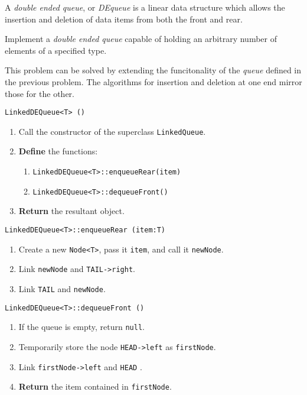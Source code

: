 

\problem A \textit{double ended queue}, or \textit{DEqueue} is a linear data structure which allows the insertion
and deletion of data items from both the front and rear.

Implement a \textit{double ended queue} capable of holding an arbitrary number of elements of a specified type.

\solution 
This problem can be solved by extending the funcitonality of the \textit{queue} defined in the previous problem. The algorithms
for insertion and deletion at one end mirror those for the other.

\algorithm
\texttt{LinkedDEQueue<T> ()}
\begin{enumerate}
	\item Call the constructor of the superclass \texttt{LinkedQueue}.
	\item \textbf{Define} the functions:
	\begin{enumerate}
		\item \texttt{LinkedDEQueue<T>::enqueueRear(item)} 
		\item \texttt{LinkedDEQueue<T>::dequeueFront()}
	\end{enumerate}
	\item \textbf{Return} the resultant object.
\end{enumerate}
\vspace{5mm}
\texttt{LinkedDEQueue<T>::enqueueRear (item:T)}
\begin{enumerate}
	\item Create a new \texttt{Node<T>}, pass it \texttt{item}, and call it \texttt{newNode}.
	\item Link \texttt{newNode} and \texttt{TAIL->right}. 
	\item Link \texttt{TAIL} and \texttt{newNode}. 
\end{enumerate}
\vspace{5mm}
\texttt{LinkedDEQueue<T>::dequeueFront ()}
\begin{enumerate}
	\item If the queue is empty, return \texttt{null}.
	\item Temporarily store the node \texttt{HEAD->left} as \texttt{firstNode}.
	\item Link \texttt{firstNode->left} and \texttt{HEAD} . 
	\item \textbf{Return} the item contained in \texttt{firstNode}. 
\end{enumerate}

